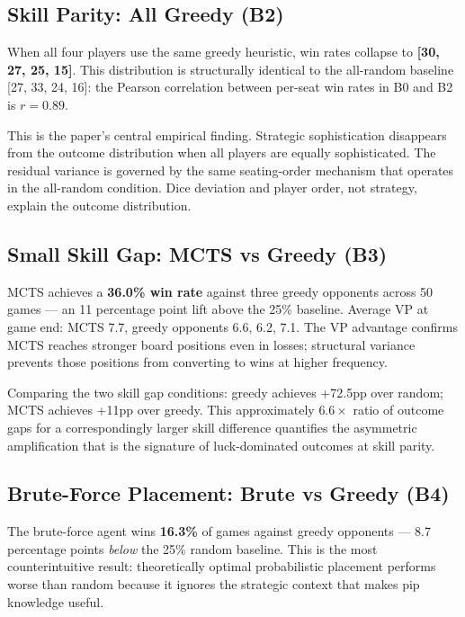 \documentclass[12pt,a4paper]{article}
\begin{document}
{\subsection{Skill Parity: All Greedy (B2)}

When all four players use the same greedy heuristic, win rates collapse
to \textbf{[30, 27, 25, 15]}. This distribution is structurally
identical to the all-random baseline [27, 33, 24, 16]: the Pearson
correlation between per-seat win rates in B0 and B2 is $r = 0.89$.

This is the paper's central empirical finding. Strategic sophistication
disappears from the outcome distribution when all players are equally
sophisticated. The residual variance is governed by the same seating-order
mechanism that operates in the all-random condition. Dice deviation and
player order, not strategy, explain the outcome distribution.

\subsection{Small Skill Gap: MCTS vs Greedy (B3)}

MCTS achieves a \textbf{36.0\% win rate} against three greedy opponents
across 50 games --- an 11 percentage point lift above the 25\% baseline.
Average VP at game end: MCTS 7.7, greedy opponents 6.6, 6.2, 7.1. The
VP advantage confirms MCTS reaches stronger board positions even in
losses; structural variance prevents those positions from converting to
wins at higher frequency.

Comparing the two skill gap conditions: greedy achieves +72.5pp over
random; MCTS achieves +11pp over greedy. This approximately
$6.6\times$ ratio of outcome gaps for a correspondingly larger skill
difference quantifies the asymmetric amplification that is the signature
of luck-dominated outcomes at skill parity.

\subsection{Brute-Force Placement: Brute vs Greedy (B4)}

The brute-force agent wins \textbf{16.3\%} of games against greedy
opponents --- 8.7 percentage points \textit{below} the 25\% random
baseline. This is the most counterintuitive result: theoretically
optimal probabilistic placement performs worse than random because it
ignores the strategic context that makes pip knowledge useful.

}
\end{document}

